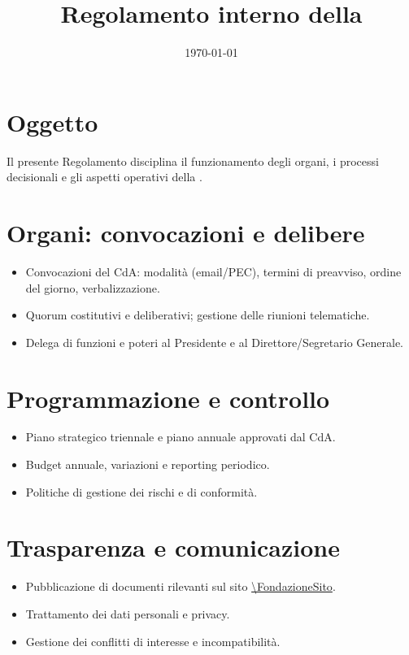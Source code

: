 \documentclass[11pt,a4paper]{article}
\title{Regolamento interno della \FondazioneNome}
\author{}
\date{\today}
\begin{document}
\begin{center}
\end{center}

\maketitle

\section*{Oggetto}
Il presente Regolamento disciplina il funzionamento degli organi, i processi decisionali e gli aspetti operativi della \FondazioneNome.

\section*{Organi: convocazioni e delibere}
\begin{itemize}
  \item Convocazioni del CdA: modalità (email/PEC), termini di preavviso, ordine del giorno, verbalizzazione.
  \item Quorum costitutivi e deliberativi; gestione delle riunioni telematiche.
  \item Delega di funzioni e poteri al Presidente e al Direttore/Segretario Generale.
\end{itemize}

\section*{Programmazione e controllo}
\begin{itemize}
  \item Piano strategico triennale e piano annuale approvati dal CdA.
  \item Budget annuale, variazioni e reporting periodico.
  \item Politiche di gestione dei rischi e di conformità.
\end{itemize}

\section*{Trasparenza e comunicazione}
\begin{itemize}
  \item Pubblicazione di documenti rilevanti sul sito \url{\FondazioneSito}.
  \item Trattamento dei dati personali e privacy.
  \item Gestione dei conflitti di interesse e incompatibilità.
\end{itemize}
\end{document}
